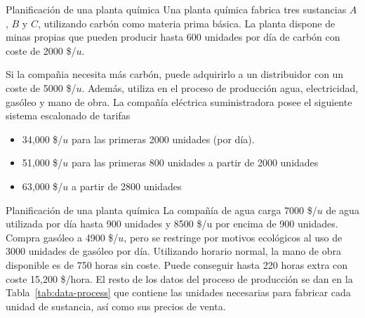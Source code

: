 \documentclass[../../main.tex]{subfiles}
\begin{document}
\begin{frame}{Planificación de una planta química}{}
  Una planta química fabrica tres sustancias $A$, $B$ y $C$, utilizando carbón como materia prima básica. La planta dispone de minas propias que pueden producir hasta 600 unidades por día de carbón con coste de 2000 \$/$u$.

  Si la compañia necesita más carbón, puede adquirirlo a un distribuidor con un coste de 5000 \$/$u$. Además, utiliza en el proceso de producción agua, electricidad, gasóleo y mano de obra. La compañía eléctrica suministradora posee el siguiente sistema escalonado de tarifas

  \begin{itemize}
\item 34,000 \$/$u$ para las primeras 2000 unidades (por día).
\item 51,000 \$/$u$ para las primeras 800 unidades a partir de 2000 unidades
\item 63,000 \$/$u$ a partir de 2800 unidades
\end{itemize}


\end{frame}

\begin{frame}{Planificación de una planta química}{}
  La compañía de agua carga 7000 \$/$u$ de agua utilizada por día hasta 900 unidades y 8500 \$/u por encima de 900 unidades. Compra gasóleo a 4900 \$/$u$, pero se restringe por motivos ecológicos al uso de 3000 unidades de gasóleo por día. Utilizando horario normal, la mano de obra disponible es de 750 horas sin coste. Puede conseguir hasta 220 horas extra con coste 15,200 \$/hora. El resto de los datos del proceso de producción se dan en la Tabla~\ref{tab:data-process} que contiene las unidades necesarias para fabricar cada unidad de sustancia, así como sus precios de venta.

\end{frame}
\end{document}
